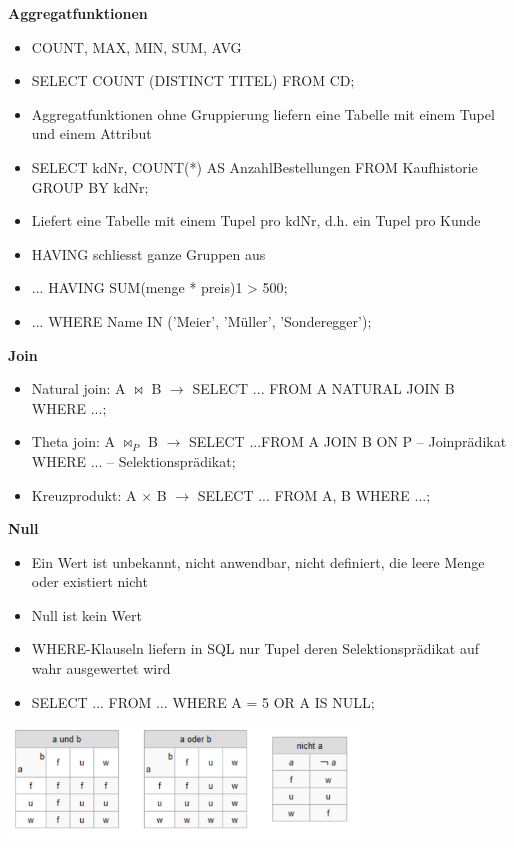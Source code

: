 \documentclass[8pt,a4paper]{scrartcl}
\begin{document}
\begin{multicols*}{3}
					\textbf{Aggregatfunktionen}
						\begin{itemize}\itemsep0pt		
							\item COUNT, MAX, MIN, SUM, AVG
							\item SELECT COUNT (DISTINCT TITEL) FROM CD$;$
							\item Aggregatfunktionen ohne Gruppierung liefern eine Tabelle mit einem Tupel und einem Attribut
							\item SELECT kdNr, COUNT(*) AS AnzahlBestellungen FROM Kaufhistorie GROUP BY kdNr$;$
							\item Liefert eine Tabelle mit einem Tupel pro kdNr, d.h. ein Tupel pro Kunde
							\item HAVING schliesst ganze Gruppen aus
							\item ... HAVING SUM(menge * preis)1 > 500$;$
							\item ... WHERE Name IN ('Meier', 'Müller', 'Sonderegger')$;$
						\end{itemize}	
						
					\textbf{Join}
						\begin{itemize}\itemsep0pt		
							\item Natural join: A $\bowtie$ B $\rightarrow$ SELECT ... FROM A NATURAL JOIN B WHERE ...$;$
							\item Theta join: A $\bowtie_{P}$ B $\rightarrow$ SELECT ...FROM A JOIN B ON P -- Joinprädikat WHERE ... -- Selektionsprädikat$;$
							\item Kreuzprodukt: A $\times$ B $\rightarrow$ SELECT ... FROM A, B WHERE ...$;$
						\end{itemize}
						
					\textbf{Null}
						\begin{itemize}\itemsep0pt		
							\item Ein Wert ist unbekannt, nicht anwendbar, nicht definiert, die leere Menge oder existiert nicht
							\item Null ist kein Wert
							\item WHERE-Klauseln liefern in SQL nur Tupel deren Selektionsprädikat auf wahr ausgewertet wird
							\item SELECT ... FROM ... WHERE A = 5 OR A IS NULL$;$
						\end{itemize}	
						
					\includegraphics[height=3cm]{img/null.png}
			

\end{multicols*}
\end{document}
